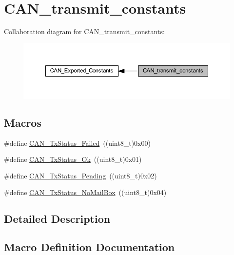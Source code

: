\hypertarget{group___c_a_n__transmit__constants}{}\section{C\+A\+N\+\_\+transmit\+\_\+constants}
\label{group___c_a_n__transmit__constants}
Collaboration diagram for C\+A\+N\+\_\+transmit\+\_\+constants\+:
\nopagebreak
\begin{figure}[H]
\begin{center}
\leavevmode
\includegraphics[width=350pt]{group___c_a_n__transmit__constants}
\end{center}
\end{figure}
\subsection*{Macros}
\begin{DoxyCompactItemize}
\item 
\#define \hyperlink{group___c_a_n__transmit__constants_ga8d193002e76c04ec8caff6b110cd5983}{C\+A\+N\+\_\+\+Tx\+Status\+\_\+\+Failed}~((uint8\+\_\+t)0x00)
\item 
\#define \hyperlink{group___c_a_n__transmit__constants_ga0b401c61922b1449de9b486dcf475c97}{C\+A\+N\+\_\+\+Tx\+Status\+\_\+\+Ok}~((uint8\+\_\+t)0x01)
\item 
\#define \hyperlink{group___c_a_n__transmit__constants_ga9678a3a51379422868083608c7394409}{C\+A\+N\+\_\+\+Tx\+Status\+\_\+\+Pending}~((uint8\+\_\+t)0x02)
\item 
\#define \hyperlink{group___c_a_n__transmit__constants_ga2620e99debd51011d3569121f2e44690}{C\+A\+N\+\_\+\+Tx\+Status\+\_\+\+No\+Mail\+Box}~((uint8\+\_\+t)0x04)
\end{DoxyCompactItemize}


\subsection{Detailed Description}


\subsection{Macro Definition Documentation}
\mbox{\label{group___c_a_n__transmit__constants_ga8d193002e76c04ec8caff6b110cd5983}} 
